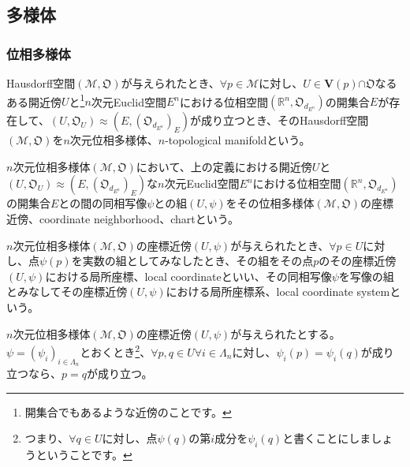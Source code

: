 \documentclass[dvipdfmx]{jsarticle}
\begin{document}
\subsection{多様体}%
\subsubsection{位相多様体}%
\begin{dfn}
Hausdorff空間$\left( \mathcal{M},\mathfrak{O} \right)$が与えられたとき、$\forall p\in \mathcal{M}$に対し、$U \in \mathbf{V}(p)\mathfrak{\cap O}$なるある開近傍$U$と\footnote{開集合でもあるような近傍のことです。}$n$次元Euclid空間$E^{n}$における位相空間$\left( \mathbb{R}^{n},\mathfrak{O}_{d_{E^{n}}} \right)$の開集合$E$が存在して、$\left( U,\mathfrak{O}_{U} \right) \approx \left( E,\left( \mathfrak{O}_{d_{E^{n}}} \right)_{E} \right)$が成り立つとき、そのHausdorff空間$\left( \mathcal{M},\mathfrak{O} \right)$を$n$次元位相多様体、$n$-topological manifoldという。
\end{dfn}
\begin{dfn}
$n$次元位相多様体$\left( \mathcal{M},\mathfrak{O} \right)$において、上の定義における開近傍$U$と$\left( U,\mathfrak{O}_{U} \right) \approx \left( E,\left( \mathfrak{O}_{d_{E^{n}}} \right)_{E} \right)$な$n$次元Euclid空間$E^{n}$における位相空間$\left( \mathbb{R}^{n},\mathfrak{O}_{d_{E^{n}}} \right)$の開集合$E$との間の同相写像$\psi$との組$(U,\psi)$をその位相多様体$\left( \mathcal{M},\mathfrak{O} \right)$の座標近傍、coordinate neighborhood、chartという。
\end{dfn}
\begin{dfn}
$n$次元位相多様体$\left( \mathcal{M},\mathfrak{O} \right)$の座標近傍$(U,\psi)$が与えられたとき、$\forall p \in U$に対し、点$\psi(p)$を実数の組としてみなしたとき、その組をその点$p$のその座標近傍$(U,\psi)$における局所座標、local coordinateといい、その同相写像$\psi$を写像の組とみなしてその座標近傍$(U,\psi)$における局所座標系、local coordinate systemという。
\end{dfn}
\begin{thm}\label{8.3.1.1}
$n$次元位相多様体$\left( \mathcal{M},\mathfrak{O} \right)$の座標近傍$(U,\psi)$が与えられたとする。$\psi = \left( \psi_{i} \right)_{i \in \varLambda_{n}}$とおくとき\footnote{つまり、$\forall q \in U$に対し、点$\psi(q)$の第$i$成分を$\psi_{i}(q)$と書くことにしましょうということです。}、$\forall p,q \in U\forall i \in \varLambda_{n}$に対し、$\psi_{i}(p) = \psi_{i}(q)$が成り立つなら、$p = q$が成り立つ。
\end{thm}
\end{document}
